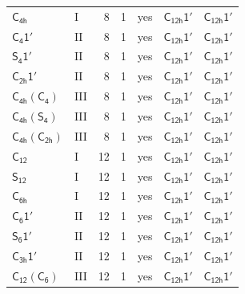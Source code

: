 \documentclass[10pt,a4paper]{article}
\numberwithin{equation}{section}
\newcommand{\grp}[1]{\mathsf{#1}}
\begin{document}
{\begin{longtable}{@{}llrrlll@{}}
\href{../../../rotation/data/pdf/C4h.pdf}{$\grp{C_{4h}}$} & I & 8 & 1 & yes & \href{C12h-1p.pdf}{$\grp{C_{12h}1'}$} & \href{C12h-1p.pdf}{$\grp{C_{12h}1'}$}\\
\href{C4-1p.pdf}{$\grp{C_{4}1'}$} & II & 8 & 1 & yes & \href{C12h-1p.pdf}{$\grp{C_{12h}1'}$} & \href{C12h-1p.pdf}{$\grp{C_{12h}1'}$}\\
\href{S4-1p.pdf}{$\grp{S_{4}1'}$} & II & 8 & 1 & yes & \href{C12h-1p.pdf}{$\grp{C_{12h}1'}$} & \href{C12h-1p.pdf}{$\grp{C_{12h}1'}$}\\
\href{C2h-1p.pdf}{$\grp{C_{2h}1'}$} & II & 8 & 1 & yes & \href{C12h-1p.pdf}{$\grp{C_{12h}1'}$} & \href{C12h-1p.pdf}{$\grp{C_{12h}1'}$}\\
\href{C4h-C4.pdf}{$\grp{C_{4h}}(\grp{C_{4}})$} & III & 8 & 1 & yes & \href{C12h-1p.pdf}{$\grp{C_{12h}1'}$} & \href{C12h-1p.pdf}{$\grp{C_{12h}1'}$}\\
\href{C4h-S4.pdf}{$\grp{C_{4h}}(\grp{S_{4}})$} & III & 8 & 1 & yes & \href{C12h-1p.pdf}{$\grp{C_{12h}1'}$} & \href{C12h-1p.pdf}{$\grp{C_{12h}1'}$}\\
\href{C4h-C2h.pdf}{$\grp{C_{4h}}(\grp{C_{2h}})$} & III & 8 & 1 & yes & \href{C12h-1p.pdf}{$\grp{C_{12h}1'}$} & \href{C12h-1p.pdf}{$\grp{C_{12h}1'}$}\\
\href{../../../rotation/data/pdf/C12.pdf}{$\grp{C_{12}}$} & I & 12 & 1 & yes & \href{C12h-1p.pdf}{$\grp{C_{12h}1'}$} & \href{C12h-1p.pdf}{$\grp{C_{12h}1'}$}\\
\href{../../../rotation/data/pdf/S12.pdf}{$\grp{S_{12}}$} & I & 12 & 1 & yes & \href{C12h-1p.pdf}{$\grp{C_{12h}1'}$} & \href{C12h-1p.pdf}{$\grp{C_{12h}1'}$}\\
\href{../../../rotation/data/pdf/C6h.pdf}{$\grp{C_{6h}}$} & I & 12 & 1 & yes & \href{C12h-1p.pdf}{$\grp{C_{12h}1'}$} & \href{C12h-1p.pdf}{$\grp{C_{12h}1'}$}\\
\href{C6-1p.pdf}{$\grp{C_{6}1'}$} & II & 12 & 1 & yes & \href{C12h-1p.pdf}{$\grp{C_{12h}1'}$} & \href{C12h-1p.pdf}{$\grp{C_{12h}1'}$}\\
\href{S6-1p.pdf}{$\grp{S_{6}1'}$} & II & 12 & 1 & yes & \href{C12h-1p.pdf}{$\grp{C_{12h}1'}$} & \href{C12h-1p.pdf}{$\grp{C_{12h}1'}$}\\
\href{C3h-1p.pdf}{$\grp{C_{3h}1'}$} & II & 12 & 1 & yes & \href{C12h-1p.pdf}{$\grp{C_{12h}1'}$} & \href{C12h-1p.pdf}{$\grp{C_{12h}1'}$}\\
\href{C12-C6.pdf}{$\grp{C_{12}}(\grp{C_{6}})$} & III & 12 & 1 & yes & \href{C12h-1p.pdf}{$\grp{C_{12h}1'}$} & \href{C12h-1p.pdf}{$\grp{C_{12h}1'}$}\\

\end{longtable}}
\end{document}
